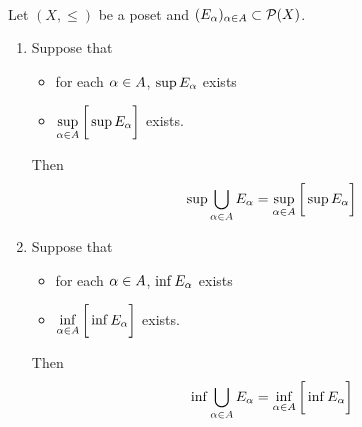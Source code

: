 \documentclass{book}
\begin{document}
	\begin{ex}   \\
		Let $(X, \leq)$ be a poset and $(E_{\alpha})_{\alpha \in A} \subset \mathcal{P}(X)$. 
		\begin{enumerate}
			\item Suppose that 
			\begin{itemize}
				\item for each $\alpha \in A$, $\sup E_{\alpha}$ exists
				\item $\sup\limits_{\alpha \in A} \bigg[ \sup E_{\alpha} \bigg]$ exists.
			\end{itemize}
			Then 
			$$\sup \bigcup\limits_{\alpha \in A} E_{\alpha} = \sup\limits_{\alpha \in A} \bigg[ \sup E_{\alpha} \bigg]$$
			\item Suppose that 
			\begin{itemize}
				\item for each $\alpha \in A$, $\inf E_{\alpha}$ exists
				\item $\inf\limits_{\alpha \in A} \bigg[ \inf E_{\alpha} \bigg]$ exists.
			\end{itemize}
			Then 
			$$\inf \bigcup\limits_{\alpha \in A} E_{\alpha} = \inf\limits_{\alpha \in A} \bigg[ \inf E_{\alpha} \bigg]$$
		\end{enumerate}
	\end{ex}
	
\end{document}

